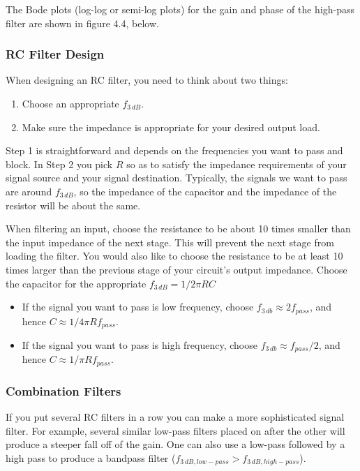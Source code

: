 \documentclass{article}
\begin{document}
The Bode plots (log-log or semi-log plots) for the gain and phase of the high-pass filter are shown in figure 4.4, below. 

\subsubsection{RC Filter Design}

When designing an RC filter, you need to think about two things:
\begin{enumerate}
\item Choose an appropriate $f_{3\,dB}$.
\item Make sure the impedance is appropriate for your desired output load.
\end{enumerate}
Step 1 is straightforward and depends on the frequencies you want to pass and block.  In Step 2 you pick $R$ so as to satisfy the impedance requirements of your signal source and your signal destination. Typically, the signals we want to pass are around $f_{3\,dB}$, so the impedance of the capacitor and the impedance of the resistor will be about the same.

When filtering an input, choose the resistance to be about 10 times smaller than the input impedance of the next stage. This will prevent the next stage from loading the filter. You would also like to choose the resistance to be at least 10 times larger than the previous stage of your circuit's output impedance.
Choose the capacitor for the appropriate $f_{3\,dB} = 1/2\pi RC$
\begin{itemize}
\item If the signal you want to pass is low frequency, choose $f_{3\,db} \approx 2 f_{pass}$, and hence $C \approx 1/4\pi R f_{pass}$.
\item If the signal you want to pass is high frequency, choose $f_{3\,db} \approx f_{pass}/2$, and hence $C \approx 1/\pi R f_{pass}$.
\end{itemize}

\subsubsection{Combination Filters}
If you put several RC filters in a row you can make a more sophisticated signal filter. For example, several similar low-pass filters placed on after the other will produce a steeper fall off of the gain. One can also use a low-pass followed by a high pass to produce a bandpass filter ($f_{3\,dB,low-pass} > f_{3\,dB,high-pass}$).
\end{document}
